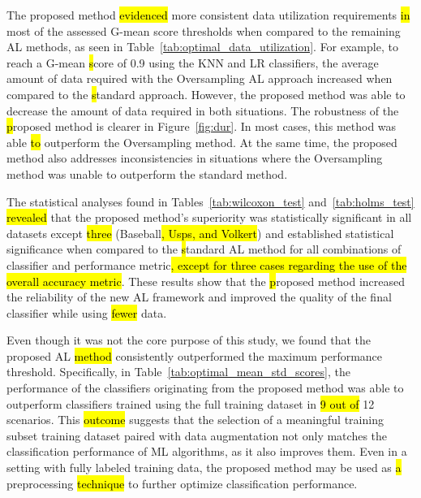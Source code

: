 \documentclass[preprint, 12pt]{elsarticle}
\begin{document}
The proposed method \hl{evidenced} more consistent data utilization requirements
\hl{in} most of the assessed G-mean score thresholds when compared to the
remaining AL methods, as seen in Table~\ref{tab:optimal_data_utilization}. For
example, to reach a G-mean \hl{s}core of 0.9 using the KNN and LR classifiers, the
average amount of data required with the Oversampling AL approach increased
when compared to the \hl{s}tandard approach. However, the proposed method was able
to decrease the amount of data required in both situations. The robustness of
the \hl{p}roposed method is clearer in Figure~\ref{fig:dur}. In most cases, this
method was able \hl{to} outperform the Oversampling method. At the same time,
the proposed method also addresses inconsistencies in situations where the
Oversampling method was unable to outperform the standard method.

The statistical analyses found in Tables~\ref{tab:wilcoxon_test}
and~\ref{tab:holms_test} \hl{revealed} that the proposed method's superiority was
statistically significant in all datasets except \hl{three} (Baseball\hl{,
Usps, and Volkert}) and established statistical significance when compared to
the \hl{s}tandard AL method for all combinations of classifier and performance
metric\hl{, except for three cases regarding the use of the overall
accuracy metric}. These results show that the \hl{p}roposed method increased the
reliability of the new AL framework and improved the quality of the final
classifier while using \hl{fewer} data.

Even though it was not the core purpose of this study, we found that the
proposed AL \hl{method} consistently outperformed the maximum performance
threshold. Specifically, in Table~\ref{tab:optimal_mean_std_scores}, the
performance of the classifiers originating from the proposed method was able
to outperform classifiers trained using the full training dataset in \hl{9 out
of} 12 scenarios. This \hl{outcome} suggests that the selection of a
meaningful training subset training dataset paired with data augmentation not
only matches the classification performance of ML algorithms, as it also
improves them. Even in a setting with fully labeled training data, the
proposed method may be used as \hl{a} preprocessing \hl{technique} to further
optimize classification performance.
\end{document}

